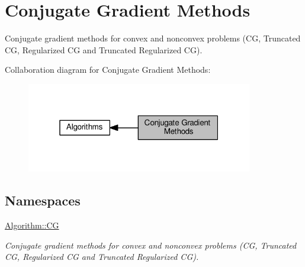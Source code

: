 \hypertarget{group__CGGroup}{}\section{Conjugate Gradient Methods}
\label{group__CGGroup}


Conjugate gradient methods for convex and nonconvex problems (C\+G, Truncated C\+G, Regularized C\+G and Truncated Regularized C\+G).  


Collaboration diagram for Conjugate Gradient Methods\+:\nopagebreak
\begin{figure}[H]
\begin{center}
\leavevmode
\includegraphics[width=280pt]{group__CGGroup}
\end{center}
\end{figure}
\subsection*{Namespaces}
\begin{DoxyCompactItemize}
\item 
 \hyperlink{namespaceAlgorithm_1_1CG}{Algorithm\+::\+C\+G}
\begin{DoxyCompactList}\small\item\em Conjugate gradient methods for convex and nonconvex problems (C\+G, Truncated C\+G, Regularized C\+G and Truncated Regularized C\+G). \end{DoxyCompactList}\end{DoxyCompactItemize}
